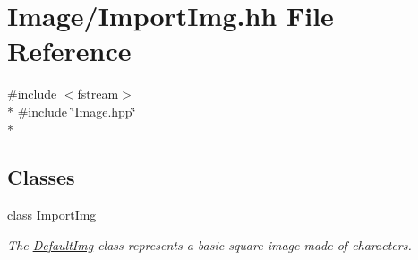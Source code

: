 \hypertarget{ImportImg_8hh}{\section{Image/\-Import\-Img.hh File Reference}
\label{ImportImg_8hh}
}
{\ttfamily \#include $<$fstream$>$}\\*
{\ttfamily \#include \char`\"{}Image.\-hpp\char`\"{}}\\*
\subsection*{Classes}
\begin{DoxyCompactItemize}
\item 
class \hyperlink{classImportImg}{Import\-Img}
\begin{DoxyCompactList}\small\item\em The \hyperlink{classDefaultImg}{Default\-Img} class represents a basic square image made of characters. \end{DoxyCompactList}\end{DoxyCompactItemize}
